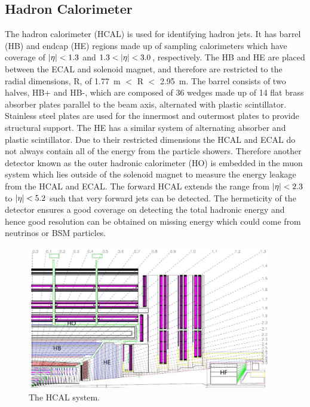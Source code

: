 \subsection{Hadron Calorimeter}

The hadron calorimeter (HCAL) is used for identifying hadron jets. It has barrel (HB) and endcap (HE) regions made up of sampling calorimeters which have coverage of $\lvert \eta \rvert<1.3$ and $1.3<\lvert \eta \rvert<3.0$, respectively. The HB and HE are placed between the ECAL and solenoid magnet, and therefore are restricted to the radial dimensions, R, of 1.77~m $<$ R $<$ 2.95~m. The barrel consists of two halves, HB+ and HB-, which are composed of 36 wedges made up of 14 flat brass absorber plates parallel to the beam axis, alternated with plastic scintillator. Stainless steel plates are used for the innermost and outermost plates to provide structural support. The HE has a similar system of alternating absorber and plastic scintillator.
Due to their restricted dimensions the HCAL and ECAL do not always contain all of the energy from the particle showers. Therefore another detector known as the outer hadronic calorimeter (HO) is embedded in the muon system which lies outside of the solenoid magnet to measure the energy leakage from the HCAL and ECAL.
The forward HCAL extends the range from $\lvert \eta \rvert<2.3$ to $\lvert \eta \rvert<5.2$ such that very forward jets can be detected. The hermeticity of the detector ensures a good coverage on detecting the total hadronic energy and hence good resolution can be obtained on missing energy which could come from neutrinos or BSM particles.

\begin{figure}[ht!]
\centering
    \includegraphics[width=0.95\textwidth]{images/HCAL.png}
    \caption{The HCAL system.}
    \label{fig:hcal}
\end{figure}

